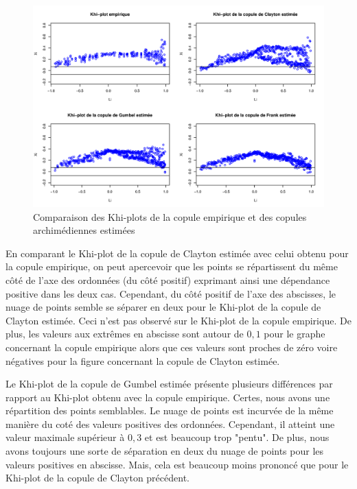 \noindent%
\begin{figure}[H]
    \begin{center}
      \includegraphics[width=17 cm, angle=0]{./pictures/archcmlkhiplot.png}
      \centering\caption{\label{2}Comparaison des Khi-plots de la copule empirique et des copules archimédiennes estimées}
    \end{center}
\end{figure}

En comparant le Khi-plot de la copule de Clayton estimée avec celui obtenu pour la copule empirique, on peut apercevoir que les points se répartissent du même côté de l'axe des ordonnées (du côté positif) exprimant ainsi une dépendance positive dans les deux cas. Cependant, du côté positif de l'axe des abscisses, le nuage de points semble se séparer en deux pour le Khi-plot de la copule de Clayton estimée. Ceci n'est pas observé sur le Khi-plot de la copule empirique. De plus, les valeurs aux extrêmes en abscisse sont autour de $0,1$ pour le graphe concernant la copule empirique alors que ces valeurs sont proches de zéro voire négatives pour la figure concernant la copule de Clayton estimée.

Le Khi-plot de la copule de Gumbel estimée présente plusieurs différences par rapport au Khi-plot obtenu avec la copule empirique. Certes, nous avons une répartition des points semblables. Le nuage de points est incurvée de la même manière du coté des valeurs positives des ordonnées. Cependant, il atteint une valeur maximale supérieur à $0,3$ et est beaucoup trop "pentu". De plus, nous avons toujours une sorte de séparation en deux du nuage de points pour les valeurs positives en abscisse. Mais, cela est beaucoup moins prononcé que pour le Khi-plot de la copule de Clayton précédent.

